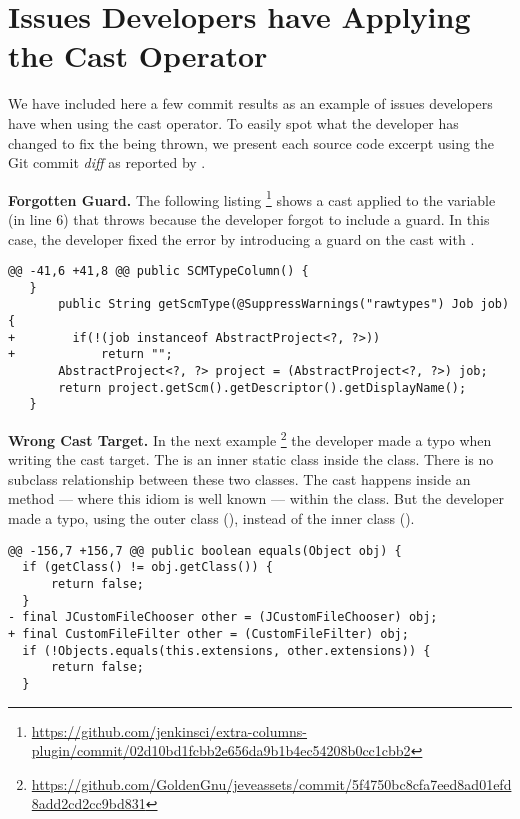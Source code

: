 \section{Issues Developers have Applying the Cast Operator}

We have included here a few commit results as an example of issues developers have when using the cast operator.
To easily spot what the developer has changed to fix the  being thrown,
we present each source code excerpt using the Git commit \emph{diff} as reported by \github{}.

\textbf{Forgotten Guard.}
The following listing%
\footnote{\url{https://github.com/jenkinsci/extra-columns-plugin/commit/02d10bd1fcbb2e656da9b1b4ec54208b0cc1cbb2}}
shows a cast applied to the variable  (in line 6) that throws  because the developer forgot to include a guard.
In this case, the developer fixed the error by introducing a guard on the cast with .

\begin{lstlisting}[style=java]
@@ -41,6 +41,8 @@ public SCMTypeColumn() {
   }
       public String getScmType(@SuppressWarnings("rawtypes") Job job) {
+        if(!(job instanceof AbstractProject<?, ?>))
+            return "";
       AbstractProject<?, ?> project = (AbstractProject<?, ?>) job;
       return project.getScm().getDescriptor().getDisplayName();
   }
\end{lstlisting}

\textbf{Wrong Cast Target.}
In the next example%
\footnote{\url{https://github.com/GoldenGnu/jeveassets/commit/5f4750bc8cfa7eed8ad01efd8add2cd2cc9bd831}}
the developer made a typo when writing the cast target.
The  is an inner static class inside the  class.
There is no subclass relationship between these two classes.
The cast happens inside an  method
--- where this idiom is well known ---
within the  class.
But the developer made a typo, using the outer class (), instead of the inner class ().

\begin{lstlisting}[style=java]
@@ -156,7 +156,7 @@ public boolean equals(Object obj) {
  if (getClass() != obj.getClass()) {
      return false;
  }
- final JCustomFileChooser other = (JCustomFileChooser) obj;
+ final CustomFileFilter other = (CustomFileFilter) obj;
  if (!Objects.equals(this.extensions, other.extensions)) {
      return false;
  }
\end{lstlisting}

